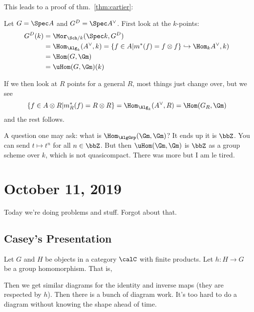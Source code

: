 \documentclass[12pt]{article}
\begin{document}
This leads to a proof of thm.~\ref{thm:cartier}:
\begin{prf}
	Let $G=\Spec A$ and $G^D=\Spec A^\vee$. First look at the $k$-points:
	\begin{align*}
		G^D(k)&= \Mor_{\Sch/k}(\Spec k, G^D)\\
		&=\Hom_{\Alg_k}(A^\vee,k)=\{f\in A|m^\ast(f)=f\otimes f\}\hookrightarrow \Hom_{k}A^\vee,k)\\
		&=\Hom(G,\Gm)\\
		&=\uHom(G,\Gm)(k)
	\end{align*}

	If we then look at $R$ points for a general $R$, most things just change over, but we see 
	\[\{f\in A\otimes R|m_R^\ast(f)=R\otimes R\}=\Hom_{\Alg_k}(A^\vee,R)=\Hom(G_R,\Gm)\]
	and the rest follows.
\end{prf}
A question one may ask: what is $\Hom_\AlgGrp(\Gm,\Gm)$? It ends up it is $\bbZ$. You can send $t\mapsto t^n$ for all $n\in\bbZ$.
But then $\uHom(\Gm,\Gm)$ is $\bbZ$ as a group scheme over $k$, which is not quasicompact. There was more but I am le tired.

\section{October 11, 2019}
Today we're doing problems and stuff. Forgot about that.

\subsection{Casey's Presentation}
Let $G$ and $H$ be objects in a category $\calC$ with finite products. Let $h:H\to G$ be a group homomorphism. That is,

Then we get similar diagrams for the identity and inverse maps (they are respected by $h$). 
Then there is a bunch of diagram work. It's too hard to do a diagram without knowing the shape ahead of time.
\end{document}
